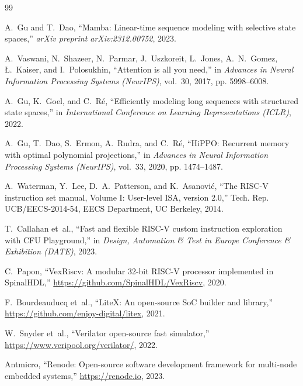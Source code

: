 \documentclass[11pt,a4paper,oneside]{report}
\begin{document}
\clearpage
\begin{thebibliography}{99}

A.~Gu and T.~Dao, ``Mamba: Linear-time sequence modeling with selective state spaces,'' \emph{arXiv preprint arXiv:2312.00752}, 2023.

A.~Vaswani, N.~Shazeer, N.~Parmar, J.~Uszkoreit, L.~Jones, A.~N.~Gomez, \L.~Kaiser, and I.~Polosukhin, ``Attention is all you need,'' in \emph{Advances in Neural Information Processing Systems (NeurIPS)}, vol.~30, 2017, pp. 5998--6008.

A.~Gu, K.~Goel, and C.~R{\'e}, ``Efficiently modeling long sequences with structured state spaces,'' in \emph{International Conference on Learning Representations (ICLR)}, 2022.

A.~Gu, T.~Dao, S.~Ermon, A.~Rudra, and C.~R{\'e}, ``HiPPO: Recurrent memory with optimal polynomial projections,'' in \emph{Advances in Neural Information Processing Systems (NeurIPS)}, vol.~33, 2020, pp. 1474--1487.

A.~Waterman, Y.~Lee, D.~A.~Patterson, and K.~Asanovi{\'c}, ``The RISC-V instruction set manual, Volume I: User-level ISA, version 2.0,'' Tech. Rep. UCB/EECS-2014-54, EECS Department, UC Berkeley, 2014.

T.~Callahan et~al., ``Fast and flexible RISC-V custom instruction exploration with CFU Playground,'' in \emph{Design, Automation \& Test in Europe Conference \& Exhibition (DATE)}, 2023.

C.~Papon, ``VexRiscv: A modular 32-bit RISC-V processor implemented in SpinalHDL,'' \url{https://github.com/SpinalHDL/VexRiscv}, 2020.

F.~Bourdeauducq et~al., ``LiteX: An open-source SoC builder and library,'' \url{https://github.com/enjoy-digital/litex}, 2021.

W.~Snyder et~al., ``Verilator open-source fast simulator,'' \url{https://www.veripool.org/verilator/}, 2022.

Antmicro, ``Renode: Open-source software development framework for multi-node embedded systems,'' \url{https://renode.io}, 2023.


\end{thebibliography}
\end{document}
